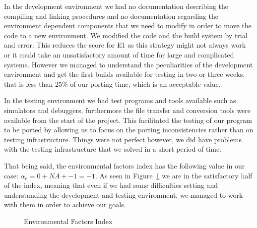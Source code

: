 In the development environment we had no documentation describing the compiling
and linking procedures and no documentation regarding the environment dependent
components that we need to modify in order to move the code to a new
environment. We modified the code and the build system by trial and error. This
reduces the score for E1 as this strategy might not always work or it could take
an unsatisfactory amount of time for large and complicated systems. However
we managed to understand the peculiarities of the development environment and
get the first builds available for testing in two or three weeks, that is less
than 25\% of our porting time, which is an acceptable value.

In the testing environment we had test programs and tools available such as
simulators and debuggers, furthermore the file transfer and conversion tools
were available from the start of the project. This facilitated the testing of
our program to be ported by allowing us to focus on the porting inconsistencies
rather than on testing infrastructure. Things were not perfect however, we did
have problems with the testing infrastructure that we solved in a short period
of time.

That being said, the environmental factors index has the following value in our
case: $\alpha_e = 0 + NA + -1 = -1$. As seen in Figure~\ref{fig:EFI} we are in the
satisfactory half of the index, meaning that even if we had some difficulties
setting and understanding the development and testing environment, we managed
to work with them in order to achieve our goals.

\begin{figure}

    \caption{Environmental Factors Index}
    \label{fig:EFI}
\end{figure}
